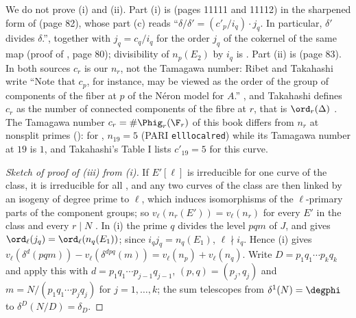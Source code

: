 We do not prove (i) and (ii). Part (i) is \cite[Theorems 1 and 2]{RibetTakahashi97} (pages 11111 and 11112) in the sharpened form of \cite[Theorem 3.2]{Takahashi01} (page 82), whose part (c) reads
``$\delta/\delta'=(c'_p/i_q)\cdot j_q$. In particular, $\delta'$ divides $\delta$.'', together with $j_q=c_q/i_q$ for the order $j_q$ of the cokernel of the same map (proof of
\cite[Theorem 2.3]{Takahashi01}, page 80); divisibility of $n_p(E_2)$ by $i_q$ is \cite[Theorem 3.2(b)]{Takahashi01}. Part (ii) is \cite[Corollary 3.5]{Takahashi01} (page 83). In both sources
$c_r$ is our $n_r$, not the Tamagawa number: Ribet and Takahashi write ``Note that $c_p$, for instance, may be viewed as the order of the group of components of the fiber at $p$ of the
N\'eron model for $A$.'' \cite[page 11111]{RibetTakahashi97}, and Takahashi defines $c_r$ as the number of connected components of the fibre at $r$, that is $\ord_r(\Delta)$
\cite[pages 75 and 76]{Takahashi01}. The Tamagawa number $c_r=\#\Phig_r(\F_r)$ of this book differs from $n_r$ at nonsplit primes (): for ,
$n_{19}=5$ (PARI \texttt{elllocalred}) while its Tamagawa number at $19$ is $1$, and Takahashi's Table I lists $c'_{19}=5$ for this curve.

\begin{proof}[Sketch of proof of (iii) from (i)]
If $E'[\ell]$ is irreducible for one curve of the class, it is irreducible for all \cite[page 11113]{RibetTakahashi97}, and any two curves of the class are then linked by an isogeny of degree
prime to $\ell$, which induces isomorphisms of the $\ell$-primary parts of the component groups; so $v_\ell(n_r(E'))=v_\ell(n_r)$ for every $E'$ in the class and every $r\mid N$
\cite[page 11111]{RibetTakahashi97}. In (i) the prime $q$ divides the level $pqm$ of $J$, and \cite[Theorem 2.7]{Takahashi01} gives $\ord_\ell(j_q)=\ord_\ell(n_q(E_1))$; since $i_qj_q=n_q(E_1)$,
$\ell\nmid i_q$. Hence (i) gives $v_\ell(\delta^d(pqm))-v_\ell(\delta^{dpq}(m))=v_\ell(n_p)+v_\ell(n_q)$. Write $D=p_1q_1\cdots p_kq_k$ and apply this with $d=p_1q_1\cdots p_{j-1}q_{j-1}$,
$(p,q)=(p_j,q_j)$ and $m=N/(p_1q_1\cdots p_jq_j)$ for $j=1,\dots,k$; the sum telescopes from $\delta^1(N)=\degphi$ to $\delta^D(N/D)=\delta_D$.
\end{proof}

